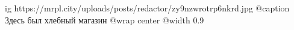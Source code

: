  
 
 
 
 

\ifcmt
  ig https://mrpl.city/uploads/posts/redactor/zy9nzwrotrp6nkrd.jpg
	@caption Здесь был хлебный магазин
  @wrap center
  @width 0.9
\fi
